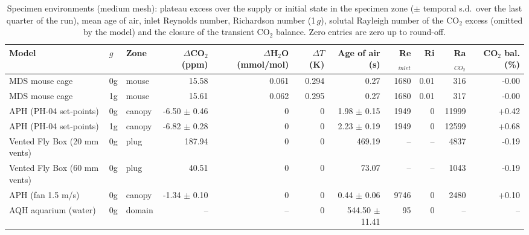 \begin{table}[htbp]\centering\scriptsize
\caption{Specimen environments (medium mesh): plateau excess over the supply or initial state in the specimen zone ($\pm$ temporal s.d.\ over the last quarter of the run), mean age of air, inlet Reynolds number, Richardson number (1\,$g$), solutal Rayleigh number of the CO$_2$ excess (omitted by the model) and the closure of the transient CO$_2$ balance. Zero entries are zero up to round-off.}\label{tab:cfd}
\begin{adjustbox}{max width=\linewidth}
\begin{tabular}{lllrrrrrrrr}
\toprule
Model & $g$ & Zone & $\Delta$CO$_2$ (ppm) & $\Delta$H$_2$O (mmol/mol) & $\Delta T$ (K) & Age of air (s) & Re$_{inlet}$ & Ri & Ra$_{CO_2}$ & CO$_2$ bal. (\%) \\
\midrule
MDS mouse cage & 0g & mouse & 15.58 & 0.061 & 0.294 & 0.27 & 1680 & 0.01 & 316 & -0.00 \\
MDS mouse cage & 1g & mouse & 15.61 & 0.062 & 0.295 & 0.27 & 1680 & 0.01 & 317 & -0.00 \\
APH (PH-04 set-points) & 0g & canopy & -6.50 $\pm$ 0.46 & 0 & 0 & 1.98 $\pm$ 0.15 & 1949 & 0 & 11999 & +0.42 \\
APH (PH-04 set-points) & 1g & canopy & -6.82 $\pm$ 0.28 & 0 & 0 & 2.23 $\pm$ 0.19 & 1949 & 0 & 12599 & +0.68 \\
Vented Fly Box (20 mm vents) & 0g & plug & 187.94 & 0 & 0 & 469.19 & -- & -- & 4837 & -0.19 \\
Vented Fly Box (60 mm vents) & 0g & plug & 40.51 & 0 & 0 & 73.07 & -- & -- & 1043 & -0.19 \\
APH (fan 1.5 m/s) & 0g & canopy & -1.34 $\pm$ 0.10 & 0 & 0 & 0.44 $\pm$ 0.06 & 9746 & 0 & 2480 & +0.10 \\
AQH aquarium (water) & 0g & domain & -- & -- & 0 & 544.50 $\pm$ 11.41 & 95 & 0 & -- & -- \\
\bottomrule
\end{tabular}
\end{adjustbox}
\end{table}
